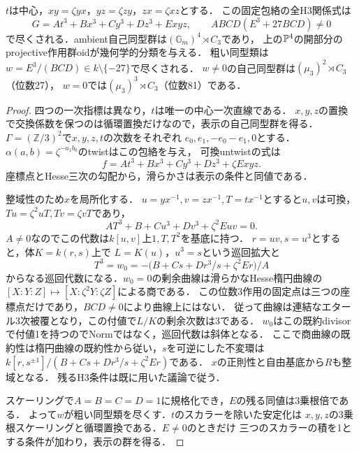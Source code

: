 \begin{proposition}[3乗根・中心一次型の全admissible係数]
\label{prop:CY-third-Hesse-classification}
$t$は中心，$xy=\zeta yx$，$yz=\zeta zy$，$zx=\zeta xz$とする．
この固定包絡の全H3関係式は
\[
 G=At^3+Bx^3+Cy^3+Dz^3+Exyz,\qquad
 ABCD(E^3+27BCD)\ne0
\]
で尽くされる．ambient自己同型群は$(\mathbb G_m)^4\rtimes C_3$であり，
上の$\mathbb P^4$の開部分のprojective作用群oidが幾何学的分類を与える．
粗い同型類は$w=E^3/(BCD)\in k\setminus\{-27\}$で尽くされる．
$w\ne0$の自己同型群は$(\mu_3)^2\rtimes C_3$（位数27），
$w=0$では$(\mu_3)^3\rtimes C_3$（位数81）である．
\end{proposition}
\begin{proof}
四つの一次指標は異なり，$t$は唯一の中心一次直線である．
$x,y,z$の置換で交換係数を保つのは循環置換だけなので，表示の自己同型群を得る．
$\Gamma=(\mathbb Z/3)^2$で$x,y,z,t$の次数をそれぞれ
$e_0,e_1,-e_0-e_1,0$とする．
$\alpha(a,b)=\zeta^{-a_1b_0}$のtwistはこの包絡を与え，
可換untwistの式は
\[
 f=At^3+Bx^3+Cy^3+Dz^3+\zeta Exyz.
\]
座標点とHesse三次の勾配から，滑らかさは表示の条件と同値である．

整域性のため$x$を局所化する．
$u=yx^{-1},v=zx^{-1},T=tx^{-1}$とすると$u,v$は可換，
$Tu=\zeta^2uT,Tv=\zeta vT$であり，
\[
 AT^3+B+Cu^3+Dv^3+\zeta^2Euv=0.
\]
$A\ne0$なのでこの代数は$k[u,v]$上$1,T,T^2$を基底に持つ．
$r=uv,s=u^3$とすると，体$K=k(r,s)$上で
$L=K(u)$，$u^3=s$という巡回拡大と
\[
 T^3=w_0=-\bigl(B+Cs+Dr^3/s+\zeta^2Er\bigr)/A
\]
からなる巡回代数になる．$w_0=0$の剰余曲線は滑らかなHesse楕円曲線の
$[X:Y:Z]\mapsto[X:\zeta^2Y:\zeta Z]$による商である．
この位数3作用の固定点は三つの座標点だけであり，$BCD\ne0$により曲線上にはない．
従って曲線は連結なエタール3次被覆となり，この付値で$L/K$の剰余次数は3である．
$w_0$はこの既約divisorで付値1を持つのでNormではなく，巡回代数は斜体となる．
ここで商曲線の既約性は楕円曲線の既約性から従い，$s$を可逆にした不変環は
$k[r,s^{\pm1}]/(B+Cs+Dr^3/s+\zeta^2Er)$である．
$x$の正則性と自由基底から$R$も整域となる．
残るH3条件は既に用いた議論で従う．

スケーリングで$A=B=C=D=1$に規格化でき，$E$の残る同値は3乗根倍である．
よって$w$が粗い同型類を尽くす．$t$のスカラーを除いた安定化は
$x,y,z$の3乗根スケーリングと循環置換である．$E\ne0$のときだけ
三つのスカラーの積を1とする条件が加わり，表示の群を得る．
\end{proof}

